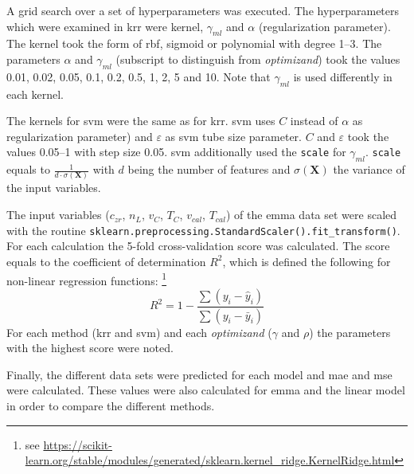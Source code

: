 A grid search over a set of hyperparameters was executed. 
The hyperparameters which were examined in \gls{krr} were kernel, $\gamma_{ml}$  and $\alpha$ (regularization parameter).
The kernel took the form of \gls{rbf}, sigmoid or polynomial with degree 1--3.
The parameters $\alpha$ and $\gamma_{ml}$ (subscript to distinguish from \textit{optimizand}) took the values 0.01, 0.02, 0.05, 0.1, 0.2, 0.5, 1, 2, 5 and 10.
Note that $\gamma_{ml}$ is used differently in each kernel. 

The kernels for \gls{svm} were the same as for \gls{krr}. 
\Gls{svm} uses $C$ instead of $\alpha$ as regularization parameter) and  $\varepsilon$ as \gls{svm} tube size parameter.
$C$ and $\varepsilon$ took the values 0.05--1 with step size 0.05. 
\Gls{svm} additionally used the \texttt{scale} for $\gamma_{ml}$.
\texttt{scale} equals to $\frac{1}{d \cdot \sigma(\mathbf{X})}$ with $d$ being the number of features 
and $\sigma(\mathbf{X})$ the variance of the input variables. 

The input variables ($c_{zr}$, $n_L$, $v_{C}$, $T_{C}$, $v_{cal}$, $T_{cal}$) 
of the \gls{emma} data set were scaled with the routine \texttt{sklearn.preprocessing.StandardScaler().fit\_transform()}. %
For each calculation the 5-fold cross-validation score was calculated. 
The score equals to the coefficient of determination $R^2$, which is defined the following for non-linear regression functions:
\footnote{see \href{https://scikit-learn.org/stable/modules/generated/sklearn.kernel\_ridge.KernelRidge.html}{https://scikit-learn.org/stable/modules/generated/sklearn.kernel\_ridge.KernelRidge.html}}
\begin{equation}
	\label{eq:r2}
	R^2 = 1-\frac{\sum (y_i - \hat{y}_i)}{\sum (y_i - \bar{y}_i)}
\end{equation}
For each method (\gls{krr} and \gls{svm}) and each \textit{optimizand} ($\gamma$ and $\rho$) 
the parameters with the highest score were noted.
 
Finally, the different data sets were predicted for each model and \gls{mae} and \gls{mse} were calculated.
These values were also calculated for \gls{emma} and the linear model in order to compare the different methods. 

